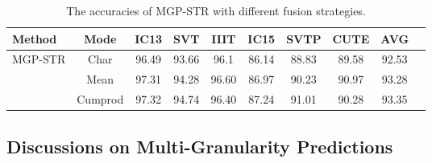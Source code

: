 \documentclass[runningheads]{llncs}
\newcommand{\ra}[1]{\renewcommand{\arraystretch}{#1}}
\begin{document}
\begin{table*}[t]\centering
\setlength{\tabcolsep}{4pt}
\ra{1}
\caption{The accuracies of MGP-STR with different fusion strategies.}
\label{tab:fuse}
\begin{tabular}{|l|c|c|c|c|c|c|c|c|c|}
\hline
Method & Mode &IC13&SVT  &IIIT   & IC15 & SVTP &CUTE  &AVG \\
\hline
\multirow{3}{*}{MGP-STR}    &  Char &96.49	&93.66	&96.1	&86.14	&88.83	&89.58	&92.53	 \\
& Mean &97.31	&94.28	&96.60	&86.97	&90.23	&90.97	&93.28	 \\
& Cumprod &97.32	&94.74	&96.40	&87.24	&91.01	&90.28	&93.35	 \\
\hline
\end{tabular}
\end{table*}

\subsection{Discussions on Multi-Granularity Predictions }
\end{document}
